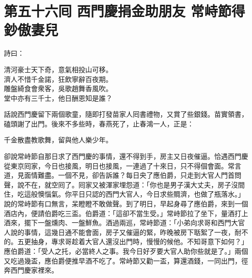 
\chapter*{第五十六囘 西門慶捐金助朋友 常峙節得鈔傲妻兒}


詩曰：

\begin{myquote}
清河豪士天下奇，意氣相投山可移。\\濟人不惜千金諾，狂飲寧辭百夜期。\\雕盤綺食會衆客，吳歌趙舞香風吹。\\堂中亦有三千士，他日酬恩知是誰？
\end{myquote}

話說西門慶留下兩個歌童，隨即打發苗家人囘書禮物，又賞了些銀錢。苗實領書，磕頭謝了出門。後來不多些時，春燕死了，止春鴻一人，正是：

\begin{myquote}
千金散盡教歌舞，留與他人樂少年。
\end{myquote}

卻說常峙節自那日求了西門慶的事情，還不得到手，房主又日夜催逼。恰遇西門慶從東京囘家，今日也接風，明日也接風，一連過了十來日，只不得個會面。常言道，見面情難盡。一個不見，卻告訴誰？每日央了應伯爵，只走到大官人門首問聲，說不在，就空囘了。{}囘家又被渾家埋怨道：「你也是男子漢大丈夫，房子沒間住，吃這般懊惱氣。你平日只認的西門大官人，今日求些賙濟，也做了瓶落水。」說的常峙節有口無言，呆瞪瞪不敢做聲。{}到了明日，早起身尋了應伯爵，來到一個酒店內，便請伯爵吃三盃。{}伯爵道：「這卻不當生受。」常峙節拉了坐下，量酒打上酒來，擺下一盤燻肉、一盤鮮魚。酒過兩巡，常峙節道：「小弟向求哥和西門大官人說的事情，這幾日通不能會面，房子又催逼的緊，昨晚被房下聒絮了一夜，耐不的。五更抽身，專求哥趁着大官人還沒出門時，慢慢的候他。{}不知哥意下如何？」應伯爵道：「受人之托，必當終人之事。我今日好歹要大官人助你些就是了。」兩個又吃過幾盃，應伯爵便推早酒不吃了。常峙節又勸一盃，算還酒錢，一同出門，徑奔西門慶家裡來。

